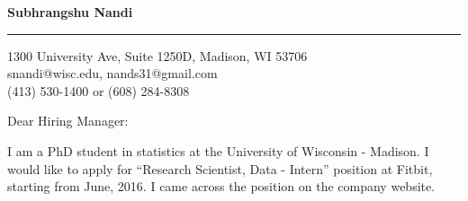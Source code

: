 \documentclass{letter} %
\begin{document}
\begin{letter}

\begin{flushleft}
{\bf Subhrangshu Nandi}
\end{flushleft}
\medskip\hrule height 1pt
\begin{flushright}
\hfill 1300 University Ave, Suite 1250D, Madison, WI 53706 \\
\hfill snandi@wisc.edu, nands31@gmail.com\\
\hfill (413) 530-1400 or (608) 284-8308
\end{flushright} 
\vfill %

\opening{Dear Hiring Manager:} 
 
\noindent %
I am a PhD student in statistics at the University of Wisconsin - Madison. I would like to apply for ``Research Scientist, Data - Intern'' position at Fitbit, starting from June, 2016. I came across the position on the company website.
 

\end{letter}
\end{document}
